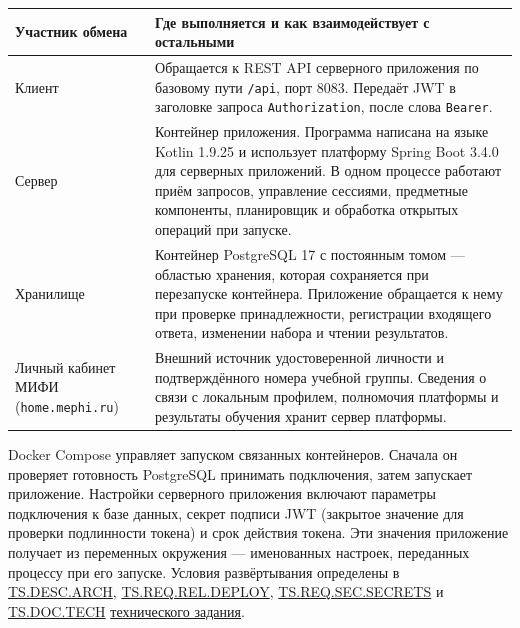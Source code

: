 \documentclass[12pt,a4paper]{article}
\begin{document}
{\def\LTcaptype{none} %
\begin{longtable}[]{@{}
  >{\raggedright\arraybackslash}p{}
  >{\raggedright\arraybackslash}p{}@{}}
\toprule\noalign{}
\begin{minipage}[b]{\linewidth}\raggedright
Участник обмена
\end{minipage} & \begin{minipage}[b]{\linewidth}\raggedright
Где выполняется и как взаимодействует с остальными
\end{minipage} \\
\midrule\noalign{}
\endhead
\bottomrule\noalign{}
\endlastfoot
Клиент & Обращается к REST API серверного приложения по базовому пути \texttt{/api}, порт 8083. Передаёт JWT в заголовке запроса \texttt{Authorization}, после слова \texttt{Bearer}. \\
Сервер & Контейнер приложения. Программа написана на языке Kotlin 1.9.25 и использует платформу Spring Boot 3.4.0 для серверных приложений. В одном процессе работают приём запросов, управление сессиями, предметные компоненты, планировщик и обработка открытых операций при запуске. \\
Хранилище & Контейнер PostgreSQL 17 с постоянным томом --- областью хранения, которая сохраняется при перезапуске контейнера. Приложение обращается к нему при проверке принадлежности, регистрации входящего ответа, изменении набора и чтении результатов. \\
Личный кабинет МИФИ (\texttt{home.\allowbreak{}mephi.\allowbreak{}ru}) & Внешний источник удостоверенной личности и подтверждённого номера учебной группы. Сведения о связи с локальным профилем, полномочия платформы и результаты обучения хранит сервер платформы. \\
\end{longtable}
}

Docker Compose управляет запуском связанных контейнеров. Сначала он проверяет готовность PostgreSQL принимать подключения, затем запускает приложение. Настройки серверного приложения включают параметры подключения к базе данных, секрет подписи JWT (закрытое значение для проверки подлинности токена) и срок действия токена. Эти значения приложение получает из переменных окружения --- именованных настроек, переданных процессу при его запуске. Условия развёртывания определены в {\href{../02\_Техническое\_задание/DOC-02\_Техническое\_задание.pdf\#ts-desc-arch}{TS.DESC.ARCH}}, {\href{../02\_Техническое\_задание/DOC-02\_Техническое\_задание.pdf\#ts-req-rel-deploy}{TS.REQ.REL.DEPLOY}}, {\href{../02\_Техническое\_задание/DOC-02\_Техническое\_задание.pdf\#ts-req-sec-secrets}{TS.REQ.SEC.SECRETS}} и {\href{../02\_Техническое\_задание/DOC-02\_Техническое\_задание.pdf\#ts-doc-tech}{TS.DOC.TECH}} {\href{../02\_Техническое\_задание/DOC-02\_Техническое\_задание.pdf\#doc-02-техническое-задание}{технического задания}}.
\end{document}
